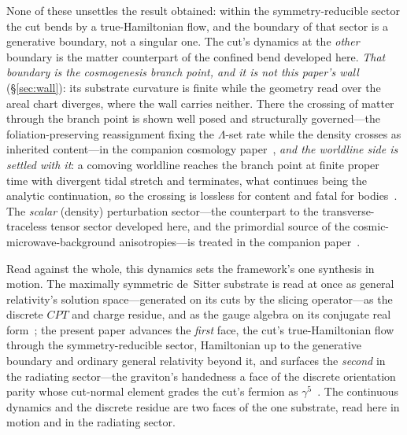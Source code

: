 \documentclass[11pt,a4paper]{article}
\theoremstyle{plain}
\theoremstyle{definition}
\theoremstyle{remark}
\begin{document}
None of these unsettles the result obtained: within the symmetry-reducible sector the cut bends by a true-Hamiltonian flow, and the boundary of that sector is a generative boundary, not a singular one. The cut's dynamics at the \emph{other} boundary is the matter counterpart of the confined bend developed here. \emph{That boundary is the cosmogenesis branch point, and it is not this paper's wall} (\S\ref{sec:wall}): its substrate curvature is finite while the geometry read over the areal chart diverges, where the wall carries neither. There the crossing of matter through the branch point is shown well posed and structurally governed---the foliation-preserving reassignment fixing the $\Lambda$-set rate while the density crosses as inherited content---in the companion cosmology paper~\cite{JanzenCRcosmology}, \emph{and the worldline side is settled with it}: a comoving worldline reaches the branch point at finite proper time with divergent tidal stretch and terminates, what continues being the analytic continuation, so the crossing is lossless for content and fatal for bodies~\cite{JanzenCRframework}. The \emph{scalar} (density) perturbation sector---the counterpart to the transverse-traceless tensor sector developed here, and the primordial source of the cosmic-microwave-background anisotropies---is treated in the companion paper~\cite{JanzenCRcosmology}.

Read against the whole, this dynamics sets the framework's one synthesis in motion. The maximally symmetric de~Sitter substrate is read at once as general relativity's solution space---generated on its cuts by the slicing operator---as the discrete $CPT$ and charge residue, and as the gauge algebra on its conjugate real form~\cite{JanzenCRframework}; the present paper advances the \emph{first} face, the cut's true-Hamiltonian flow through the symmetry-reducible sector, Hamiltonian up to the generative boundary and ordinary general relativity beyond it, and surfaces the \emph{second} in the radiating sector---the graviton's handedness a face of the discrete orientation parity whose cut-normal element grades the cut's fermion as $\gamma^5$~\cite{JanzenGeometricCore}. The continuous dynamics and the discrete residue are two faces of the one substrate, read here in motion and in the radiating sector.
\end{document}
